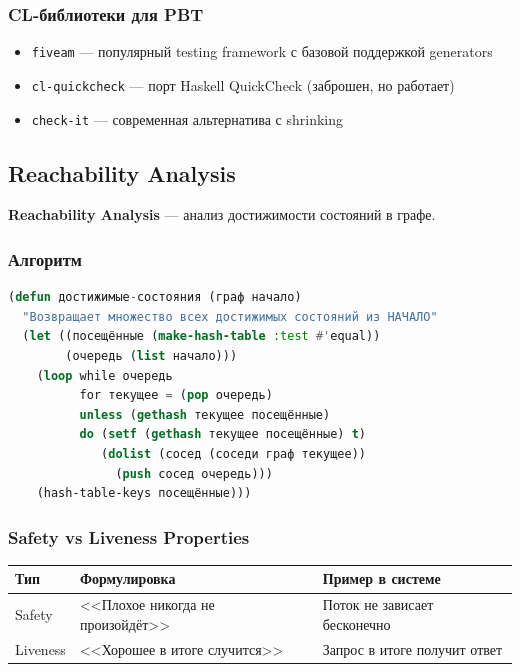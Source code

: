 \documentclass[10pt, oneside]{article}
\begin{document}
\subsubsection{CL-библиотеки для PBT}

\begin{itemize}[leftmargin=1.5em]
  \item \texttt{fiveam} --- популярный testing framework с базовой поддержкой generators
  \item \texttt{cl-quickcheck} --- порт Haskell QuickCheck (заброшен, но работает)
  \item \texttt{check-it} --- современная альтернатива с shrinking
\end{itemize}

\subsection{Reachability Analysis}

\textbf{Reachability Analysis} --- анализ достижимости состояний в графе.

\subsubsection{Алгоритм}

\begin{lstlisting}[language=CommonLisp,caption={BFS для анализа достижимости}]
(defun достижимые-состояния (граф начало)
  "Возвращает множество всех достижимых состояний из НАЧАЛО"
  (let ((посещённые (make-hash-table :test #'equal))
        (очередь (list начало)))
    (loop while очередь
          for текущее = (pop очередь)
          unless (gethash текущее посещённые)
          do (setf (gethash текущее посещённые) t)
             (dolist (сосед (соседи граф текущее))
               (push сосед очередь)))
    (hash-table-keys посещённые)))
\end{lstlisting}

\subsubsection{Safety vs Liveness Properties}

\begin{center}
\begin{tabularx}{\textwidth}{lLL}
  \toprule
  \textbf{Тип} & \textbf{Формулировка} & \textbf{Пример в системе} \\
  \midrule
  Safety   & <<Плохое никогда не произойдёт>> & Поток не зависает бесконечно \\
  Liveness & <<Хорошее в итоге случится>>     & Запрос в итоге получит ответ \\
  \bottomrule
\end{tabularx}
\end{center}
\end{document}
